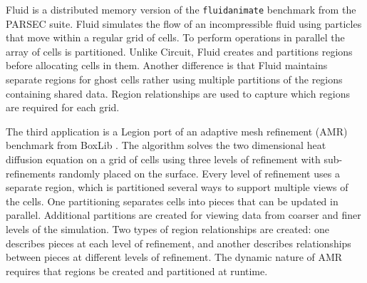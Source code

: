 Fluid is a distributed memory version of the {\tt fluidanimate} benchmark from the PARSEC 
suite\cite{bienia11benchmarking}.  Fluid simulates the flow of an incompressible fluid
using particles that move within a regular grid of cells.  To perform operations in 
parallel the array of cells is partitioned.  Unlike
Circuit, Fluid creates and partitions regions before
allocating cells in them. 
Another difference is that Fluid
maintains separate regions for ghost cells rather using multiple partitions of
the regions containing shared data.  Region relationships are used to capture
which regions are required for each grid.


The third application is a Legion port of an adaptive mesh refinement (AMR) benchmark 
from BoxLib \cite{BoxLib}.  The algorithm solves the two
dimensional heat diffusion equation on a grid of cells using three levels of refinement with sub-refinements
randomly placed on the surface.  
Every level of refinement uses a separate region, which is partitioned several ways to support multiple views of
the cells.  One partitioning separates cells into pieces that can be updated in
parallel.  Additional partitions are created for viewing data from coarser and finer levels of
the simulation.  Two types of region relationships are created: one describes pieces at 
each level of refinement, and another describes relationships between pieces at different
levels of refinement.  
The dynamic nature of AMR requires that regions be created and partitioned at runtime.  


